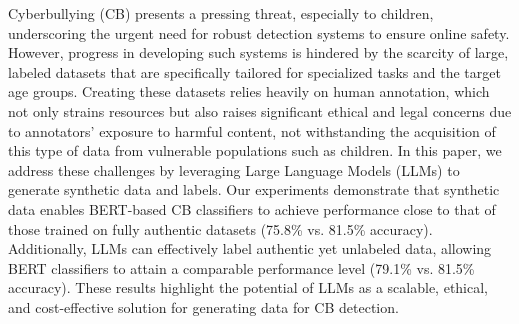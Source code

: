 Cyberbullying (CB) presents a pressing threat, especially to children, underscoring the urgent need for robust detection systems to ensure online safety. However, progress in developing such systems is hindered by the scarcity of large, labeled datasets that are specifically tailored for specialized tasks and the target age groups.
Creating these datasets relies heavily on human annotation, which not only strains resources but also raises significant ethical and legal concerns due to annotators’ exposure to harmful content, not withstanding the acquisition of this type of data from vulnerable populations such as children. In this paper, we address these challenges by leveraging Large Language Models (LLMs) to generate synthetic data and labels.
Our experiments demonstrate that synthetic data enables BERT-based CB classifiers to achieve performance close to that of those trained on fully authentic datasets (75.8\% vs. 81.5\% accuracy). Additionally, LLMs can effectively label authentic yet unlabeled data, allowing BERT classifiers to attain a comparable performance level (79.1\% vs. 81.5\% accuracy). These results highlight the potential of LLMs as a scalable, ethical, and cost-effective solution for generating data for CB detection.

